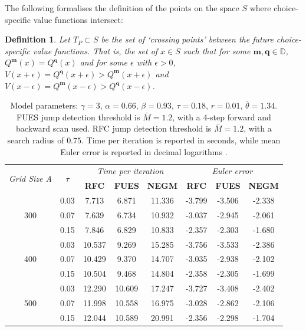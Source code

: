 \documentclass[12pt]{article}
\newtheorem{definition}{Definition}
\newcommand{\DChSet}{\mathbb{D}}
\newcommand{\mVecVar}{\mathbf{m}}
\newcommand{\qVecVar}{\mathbf{q}}
\begin{document}
The following formalises the definition of the points on the space $S$ where choice-specific value functions intersect:
%
\begin{definition}\label{def: TP}
Let $T_{P}\subset S$ be the set of `crossing points' between the future choice-specific value functions. That is, the set of $x\in S$ such that for some $\mVecVar,\qVecVar\in \DChSet$, $Q^{\mVecVar}(x) = Q^{\qVecVar}(x)$ and for some $\epsilon$ with $\epsilon>0$, $V(x+\epsilon) = Q^{\qVecVar}(x+\epsilon)> Q^{\mVecVar}(x+\epsilon)$ and $V(x-\epsilon) = Q^{\mVecVar}(x-\epsilon)> Q^{\qVecVar}(x-\epsilon)$. 
\end{definition}

\vspace{0.5em}

\begin{table}[!ht]
\centering
\caption{\small Speed and accuracy of FUES in the continuous housing investment with adjustment frictions model with infinite horizon.}\label{table:housinginf}
\small
\begin{tabular}{ccccc|ccc}
\toprule
\multirow{2}{*}{\textit{Grid Size A}} & \multirow{2}{*}{\textit{$\tau$}} & \multicolumn{3}{c}{\textit{Time per iteration}} & \multicolumn{3}{c}{\textit{Euler error}} \\
& & \textbf{RFC} & \textbf{FUES} & \textbf{NEGM} & \textbf{RFC} & \textbf{FUES} & \textbf{NEGM} \\
\midrule
\multirow{3}{*}{300} & 0.03 & 7.713 & 6.871 & 11.336 & -3.799 & -3.506 & -2.338 \\
             & 0.07 & 7.639 & 6.734 & 10.932 & -3.037 & -2.945 & -2.061 \\
             & 0.15 & 7.846 & 6.829 & 10.833 & -2.357 & -2.303 & -1.680 \\
\midrule
\multirow{3}{*}{400} & 0.03 & 10.537 & 9.269 & 15.285 & -3.756 & -3.533 & -2.386 \\
             & 0.07 & 10.429 & 9.370 & 14.707 & -3.035 & -2.938 & -2.102 \\
             & 0.15 & 10.504 & 9.468 & 14.804 & -2.358 & -2.305 & -1.699 \\
\midrule
\multirow{3}{*}{500} & 0.03 & 12.290 & 10.609 & 17.247 & -3.727 & -3.408 & -2.402 \\
             & 0.07 & 11.998 & 10.558 & 16.975 & -3.028 & -2.862 & -2.106 \\
             & 0.15 & 12.044 & 10.589 & 20.991 & -2.356 & -2.298 & -1.704 \\
\midrule
\bottomrule
\end{tabular}

\vspace{1em}

\caption{\small Model parameters: $\gamma = 3$, $\alpha = 0.66$, $\beta = 0.93$, $\tau = 0.18$, $r = 0.01$, $\bar{\theta} = 1.34$. FUES jump detection threshold is $\bar{M} = 1.2$, with a 4-step forward and backward scan used. RFC jump detection threshold is $\bar{M} = 1.2$, with a search radius of $0.75$. Time per iteration is reported in seconds, while mean Euler error is reported in decimal logarithms \citep{JUDD1992410, Fella2014, Druedahl2017}.}
\end{table}
\end{document}
